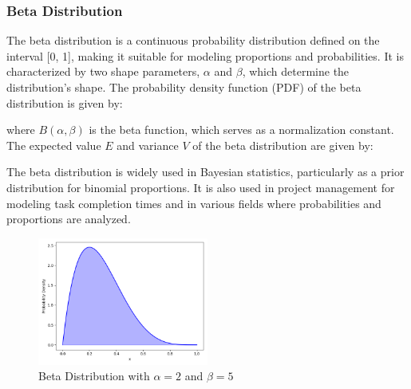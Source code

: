\subsubsection{Beta Distribution}\label{Beta Distribution}
The beta distribution is a continuous probability distribution defined on the interval [0, 1], making it suitable for modeling proportions and probabilities. It is characterized by two shape parameters, $\alpha$ and $\beta$, which determine the distribution's shape. The probability density function (PDF) of the beta distribution is given by:

where $B(\alpha, \beta)$ is the beta function, which serves as a normalization constant. The expected value $E$ and variance $V$ of the beta distribution are given by:


The beta distribution is widely used in Bayesian statistics, particularly as a prior distribution for binomial proportions. It is also used in project management for modeling task completion times and in various fields where probabilities and proportions are analyzed.

\begin{figure}[h]
    \centering
    \includegraphics[width=0.5\textwidth]{../images/plot_beta_distribution.png}
    \caption{Beta Distribution with $\alpha=2$ and $\beta=5$}
    \label{fig:beta_distribution}
\end{figure}

